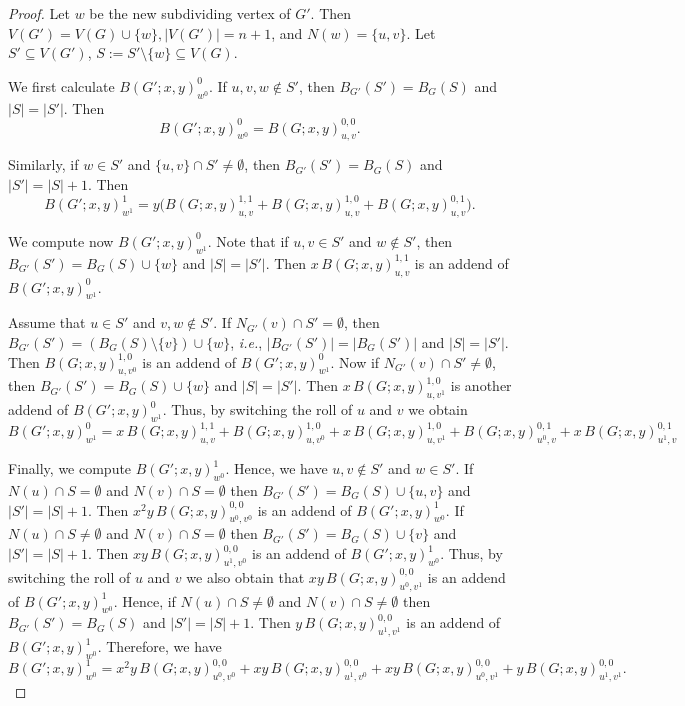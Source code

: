 \documentclass[review]{elsarticle}
\begin{document}
\begin{proof} Let $w$ be the new subdividing vertex of $G'$.  Then $V(G')=V(G)\cup \{w\}, |V(G')|=n+1$, and
$N(w)=\{u,v\}$. Let
$S' \subseteq V(G')$, $S:= S' \setminus \{w\} \subseteq V(G)$. 

We first calculate $B(G';x,y)^{0}_{w^{0}}$.
If $u,v,w\notin S'$, then $B_{G'}(S')=B_{G}(S)$ and $|S|=|S'|$.
Then
\[
B(G';x,y)^{0}_{w^{0}}= B(G;x,y)^{0,0}_{u,v}.
\]

Similarly, if $w\in S'$ and $\{u,v\}\cap S'\neq \emptyset$, then $B_{G'}(S')=B_{G}(S)$ and $|S'|=|S|+1$.
Then
\[
B(G';x,y)^{1}_{w^{1}}= y \Big( B(G;x,y)^{1,1}_{u,v} + B(G;x,y)^{1,0}_{u,v} + B(G;x,y)^{0,1}_{u,v} \Big).
\]

We compute now $B(G';x,y)^{0}_{w^{1}}$. 
Note that if $u,v\in S'$ and $w \notin S'$, then  $B_{G'}(S')=B_{G}(S) \cup \{w\}$ and $|S|=|S'|$. 
Then
$x\,B(G;x,y)^{1,1}_{u,v}$ is an addend of $B(G';x,y)^{0}_{w^{1}}$.

Assume that $u \in S'$ and $v,w \notin S'$. If $N_{G'}(v)\cap S'=\emptyset$, then
$B_{G'}(S')=(B_{G}(S)\setminus \{v \}) \cup \{ w\}$, \emph{i.e.}, $|B_{G'}(S')|=|B_{G}(S')|$ and $|S|=|S'|$. Then $B(G;x,y)^{1,0}_{u,v^{0}}$
is an addend of $B(G';x,y)^{0}_{w^{1}}.$  
Now if $N_{G'}(v)\cap S' \neq \emptyset$, then
$B_{G'}(S')=B_{G}(S) \cup \{w \} $ and $|S|=|S'|$. Then $x\,B(G;x,y)^{1,0}_{u,v^{1}}$ is another addend of $B(G';x,y)^{0}_{w^{1}}$. Thus, by switching the roll of $u$ and $v$ we obtain
\[
 B(G';x,y)^{0}_{w^{1}} = x\,B(G;x,y)^{1,1}_{u,v} + B(G;x,y)^{1,0}_{u,v^{0}} + x\,B(G;x,y)^{1,0}_{u,v^{1}} + B(G;x,y)^{0,1}_{u^{0},v} + x\,B(G;x,y)^{0,1}_{u^{1},v}
\]

Finally, we compute $B(G';x,y)^{1}_{w^{0}}$. Hence, we have $u,v\notin S'$ and $w \in S'$. 
If $N(u)\cap S=\emptyset$ and $N(v)\cap S=\emptyset$ then  $B_{G'}(S')=B_{G}(S) \cup \{u,v\}$ and $|S'|=|S|+1$. 
Then
$x^2y\,B(G;x,y)^{0,0}_{u^0,v^0}$ is an addend of $B(G';x,y)^{1}_{w^{0}}$.
If $N(u)\cap S\neq\emptyset$ and $N(v)\cap S=\emptyset$ then  $B_{G'}(S')=B_{G}(S) \cup \{v\}$ and $|S'|=|S|+1$. 
Then
$xy\,B(G;x,y)^{0,0}_{u^1,v^0}$ is an addend of $B(G';x,y)^{1}_{w^{0}}$.
Thus, by switching the roll of $u$ and $v$ we also obtain that $xy\,B(G;x,y)^{0,0}_{u^0,v^1}$ is an addend of $B(G';x,y)^{1}_{w^{0}}$.
Hence, if $N(u)\cap S\neq\emptyset$ and $N(v)\cap S\neq\emptyset$ then  $B_{G'}(S')=B_{G}(S)$ and $|S'|=|S|+1$. 
Then
$y\,B(G;x,y)^{0,0}_{u^1,v^1}$ is an addend of $B(G';x,y)^{1}_{w^{0}}$.
Therefore, we have
\[
 B(G';x,y)^{1}_{w^{0}}= x^{2}y\,B(G;x,y)^{0,0}_{u^{0},v^{0}} +xy\,B(G;x,y)^{0,0}_{u^{1},v^{0}}+xy\,B(G;x,y)^{0,0}_{u^{0},v^{1}}
+ y\,B(G;x,y)^{0,0}_{u^{1},v^{1}}.
\]

\end{proof}
\end{document}

